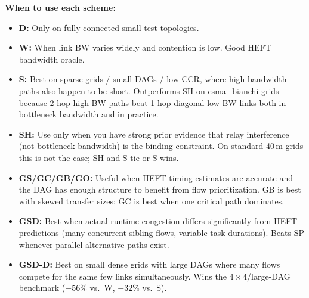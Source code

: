 \documentclass[11pt]{article}
\begin{document}
\medskip
\textbf{When to use each scheme:}
\begin{itemize}
  \item \textbf{D:} Only on fully-connected small test topologies.
  \item \textbf{W:} When link BW varies widely and contention is low.  Good
        HEFT bandwidth oracle.
  \item \textbf{S:} Best on sparse grids / small DAGs / low CCR, where
        high-bandwidth paths also happen to be short.  Outperforms SH on
        csma\_bianchi grids because 2-hop high-BW paths beat 1-hop diagonal
        low-BW links both in bottleneck bandwidth and in practice.
  \item \textbf{SH:} Use only when you have strong prior evidence that relay
        interference (not bottleneck bandwidth) is the binding constraint.
        On standard 40\,m grids this is not the case; SH and S tie or S wins.
  \item \textbf{GS/GC/GB/GO:} Useful when HEFT timing estimates are accurate
        and the DAG has enough structure to benefit from flow prioritization.
        GB is best with skewed transfer sizes; GC is best when one critical
        path dominates.
  \item \textbf{GSD:} Best when actual runtime congestion differs significantly
        from HEFT predictions (many concurrent sibling flows, variable task
        durations).  Beats SP whenever parallel alternative paths exist.
  \item \textbf{GSD-D:} Best on small dense grids with large DAGs where many
        flows compete for the same few links simultaneously.  Wins the
        $4\times4$/large-DAG benchmark ($-56\%$ vs.\ W, $-32\%$ vs.\ S).
\end{itemize}
\end{document}
